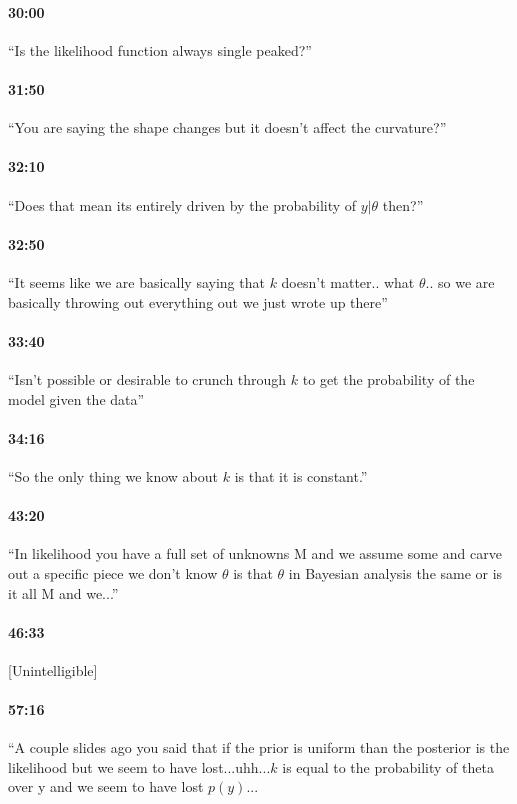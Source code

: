 \documentclass[11pt]{article}
\begin{document}
\paragraph{30:00} ``Is the likelihood function always single peaked?''
 
\paragraph{31:50} ``You are saying the shape changes but it doesn't affect the curvature?''

\paragraph{32:10} ``Does that mean its entirely driven by the probability of $y|\theta$ then?''

\paragraph{32:50} ``It seems like we are basically saying that $k$ doesn't matter.. what $\theta$.. so we are basically throwing out everything out we just wrote up there''

\paragraph{33:40} ``Isn't possible or desirable to crunch through $k$ to get the probability of the model given the data''

\paragraph{34:16} ``So the only thing we know about $k$ is that it is constant.''

\paragraph{43:20} ``In likelihood you have a full set of unknowns M and we assume some and carve out a specific piece we don't know $\theta$ is that $\theta$ in Bayesian analysis the same or is it all M and we...''

\paragraph{46:33} [Unintelligible]

\paragraph{57:16} ``A couple slides ago you said that if the prior is uniform than the posterior is the likelihood but we seem to have lost...uhh...$k$ is equal to the probability of theta over y and we seem to have lost $p(y)$...
\end{document}
